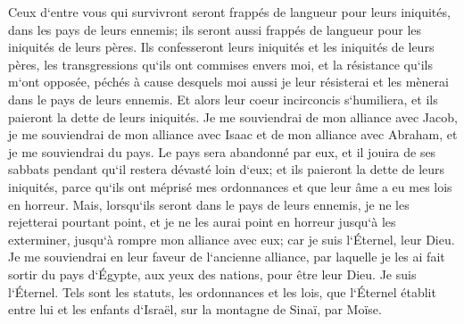 \verse Ceux d`entre vous qui survivront seront frappés de langueur pour leurs iniquités, dans les pays de leurs ennemis; ils seront aussi frappés de langueur pour les iniquités de leurs pères. 
\verse Ils confesseront leurs iniquités et les iniquités de leurs pères, les transgressions qu`ils ont commises envers moi, et la résistance qu`ils m`ont opposée, 
\verse péchés à cause desquels moi aussi je leur résisterai et les mènerai dans le pays de leurs ennemis. Et alors leur coeur incirconcis s`humiliera, et ils paieront la dette de leurs iniquités. 
\verse Je me souviendrai de mon alliance avec Jacob, je me souviendrai de mon alliance avec Isaac et de mon alliance avec Abraham, et je me souviendrai du pays. 
\verse Le pays sera abandonné par eux, et il jouira de ses sabbats pendant qu`il restera dévasté loin d`eux; et ils paieront la dette de leurs iniquités, parce qu`ils ont méprisé mes ordonnances et que leur âme a eu mes lois en horreur. 
\verse Mais, lorsqu`ils seront dans le pays de leurs ennemis, je ne les rejetterai pourtant point, et je ne les aurai point en horreur jusqu`à les exterminer, jusqu`à rompre mon alliance avec eux; car je suis l`Éternel, leur Dieu. 
\verse Je me souviendrai en leur faveur de l`ancienne alliance, par laquelle je les ai fait sortir du pays d`Égypte, aux yeux des nations, pour être leur Dieu. Je suis l`Éternel. 
\verse Tels sont les statuts, les ordonnances et les lois, que l`Éternel établit entre lui et les enfants d`Israël, sur la montagne de Sinaï, par Moïse. 

